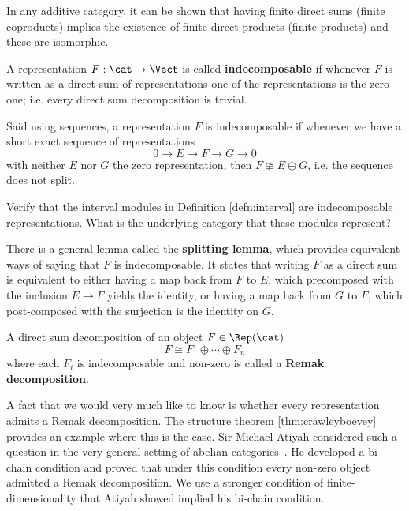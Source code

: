 \begin{rmk}
In any additive category, it can be shown that having finite direct sums (finite coproducts) implies the existence of finite direct products (finite products) and these are isomorphic. 
\end{rmk}

\begin{defn}[Indecomposable]
	A representation $F:\cat\to\Vect$ is called \textbf{indecomposable} if whenever $F$ is written as a direct sum of representations one of the representations is the zero one; i.e. every direct sum decomposition is trivial.
	
	Said using sequences, a representation $F$ is indecomposable if whenever we have a short exact sequence of representations
	\[
	0\to E \to F \to G \to 0
	\] 
	with neither $E$ nor $G$ the zero representation, then $F\ncong E\oplus G$, i.e. the sequence does not split.
\end{defn}

\begin{exr}
Verify that the interval modules in Definition \ref{defn:interval} are indecomposable representations. What is the underlying category that these modules represent?
\end{exr}

\begin{rmk}
There is a general lemma called the \textbf{splitting lemma}, which provides equivalent ways of saying that $F$ is indecomposable. It states that writing $F$ as a direct sum is equivalent to either having a map back from $F$ to $E$, which precomposed with the inclusion $E\to F$ yields the identity, or having a map back from $G$ to $F$, which post-composed with the surjection is the identity on $G$.
\end{rmk}

\begin{defn}
	A direct sum decomposition of an object $F\in\Rep(\cat)$
	\[
		F\cong F_1\oplus\cdots\oplus F_n
	\]
	where each $F_i$ is indecomposable and non-zero is called a \textbf{Remak decomposition}.
\end{defn}

A fact that we would very much like to know is whether every representation admits a Remak decomposition. The structure theorem \ref{thm:crawleyboevey} provides an example where this is the case. Sir Michael Atiyah considered such a question in the very general setting of abelian categories~\cite{atiyah_ks}. He developed a bi-chain condition and proved that under this condition every non-zero object admitted a Remak decomposition. We use a stronger condition of finite-dimensionality that Atiyah showed implied his bi-chain condition.

